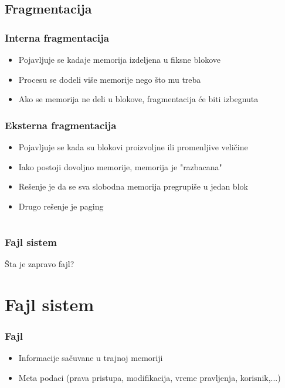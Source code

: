 \documentclass{beamer}
\begin{document}
\subsection*{Fragmentacija}
\begin{frame}
    \frametitle{Interna fragmentacija}
    \begin{itemize}
        \item Pojavljuje se kadaje memorija izdeljena u fiksne blokove \newline
        \item Procesu se dodeli više memorije nego što mu treba \newline
        \item Ako se memorija ne deli u blokove, fragmentacija će biti izbegnuta
    \end{itemize}
\end{frame}

\begin{frame}
    \frametitle{Eksterna fragmentacija}
    \begin{itemize}
        \item Pojavljuje se kada su blokovi proizvoljne ili promenljive veličine \newline
        \item Iako postoji dovoljno memorije, memorija je "razbacana" \newline
        \item Rešenje je da se sva slobodna memorija pregrupiše u jedan blok \newline
        \item Drugo rešenje je paging
    \end{itemize}
\end{frame}

\section*{}
\subsection*{}
\begin{frame}
    \frametitle{Fajl sistem}
    \begin{center}
        \large{Šta je zapravo fajl?}
    \end{center}
\end{frame}

\section*{Fajl sistem}
\begin{frame}
    \frametitle{Fajl}
    \begin{itemize}
        \item Informacije sačuvane u trajnoj memoriji \newline
        \item Meta podaci (prava pristupa, modifikacija, vreme pravljenja, korisnik,...)
    \end{itemize}
\end{frame}
\end{document}
